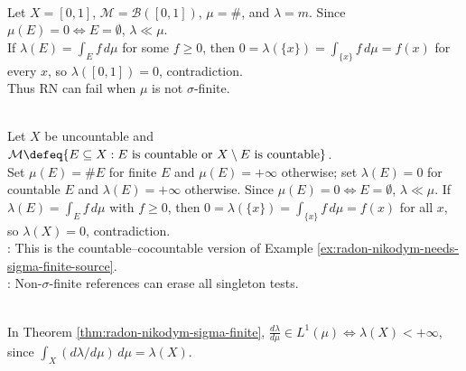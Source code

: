 \begin{example} \label{ex:radon-nikodym-needs-sigma-finite-source} \\
Let $X=[0,1]$, $\mathcal{M}=\mathcal{B}([0,1])$, $\mu=\#$, and $\lambda=m$. Since $\mu(E)=0\Leftrightarrow E=\emptyset$, $\lambda\ll\mu$.\\
If $\lambda(E)=\int_E f\,d\mu$ for some $f\geq0$, then $0=\lambda(\{x\})=\int_{\{x\}}f\,d\mu=f(x)$ for every $x$, so $\lambda([0,1])=0$, contradiction.\\
Thus RN can fail when $\mu$ is not $\sigma$-finite.
\end{example}

\begin{example} \label{ex:countable-cocountable-radon-nikodym-failure} \\
Let $X$ be uncountable and $\mathcal{M}\defeq\{E\subseteq X:E\text{ is countable or }X\setminus E\text{ is countable}\}$.\\
Set $\mu(E)=\#E$ for finite $E$ and $\mu(E)=+\infty$ otherwise; set $\lambda(E)=0$ for countable $E$ and $\lambda(E)=+\infty$ otherwise. Since $\mu(E)=0\Leftrightarrow E=\emptyset$, $\lambda\ll\mu$. If $\lambda(E)=\int_Ef\,d\mu$ with $f\geq0$, then $0=\lambda(\{x\})=\int_{\{x\}}f\,d\mu=f(x)$ for all $x$, so $\lambda(X)=0$, contradiction.\\
: This is the countable--cocountable version of Example \ref{ex:radon-nikodym-needs-sigma-finite-source}.\\
: Non-$\sigma$-finite references can erase all singleton tests.
\end{example}

\begin{remark} \label{rem:rn-derivative-integrability-finiteness} \\
In Theorem \ref{thm:radon-nikodym-sigma-finite}, $\frac{d\lambda}{d\mu}\in L^1(\mu)\Leftrightarrow\lambda(X)<+\infty$, since $\int_X(d\lambda/d\mu)\,d\mu=\lambda(X)$.
\end{remark}

